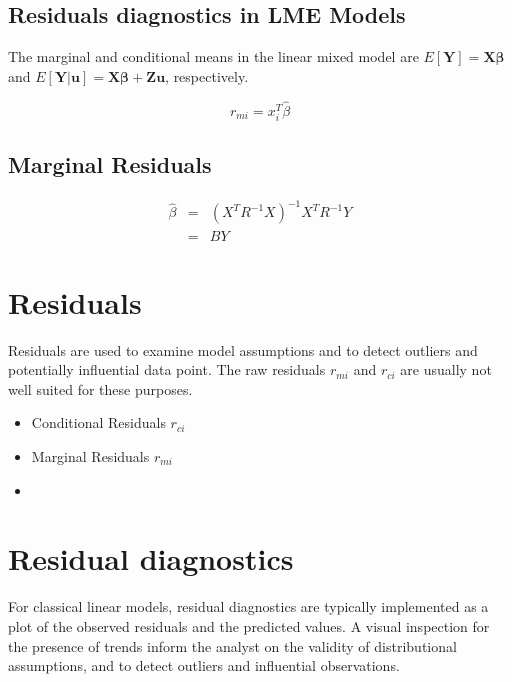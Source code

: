 \documentclass[Main.tex]{subfiles}
\begin{document}
	
	
	\subsection{Residuals diagnostics in LME Models}
	
	The marginal and conditional means in the linear mixed model are
	$E[\boldsymbol{Y}] = \boldsymbol{X}\boldsymbol{\beta}$ and
	$E[\boldsymbol{Y|\boldsymbol{u}}] = \boldsymbol{X}\boldsymbol{\beta} + \boldsymbol{Z}\boldsymbol{u}$, respectively.
	
	
	
	
	
	
	
	
	
	
	\begin{equation}
	r_{mi}=x^{T}_{i}\hat{\beta}
	\end{equation}
	
	
	\subsection{Marginal Residuals}
	\begin{eqnarray}
	\hat{\beta} &=& (X^{T}R^{-1}X)^{-1}X^{T}R^{-1}Y \nonumber \\
	&=& BY \nonumber
	\end{eqnarray}
	
	
	
	
	
	\section*{Residuals}
	
	Residuals are used to examine model assumptions and to detect outliers and potentially influential data
	point. The raw residuals $r_{mi}$ and $r_{ci}$ are usually not well suited for these purposes.
	
	\begin{itemize}
		\item Conditional Residuals $r_{ci}$
		\item Marginal Residuals $r_{mi}$
		\item 
	\end{itemize}
	
	
	\section{Residual diagnostics} %
	For classical linear models, residual diagnostics are typically implemented as a plot of the observed residuals and the predicted values. A visual inspection for the presence of trends inform the analyst on the validity of distributional assumptions, and to detect outliers and influential observations.
	
\end{document}

